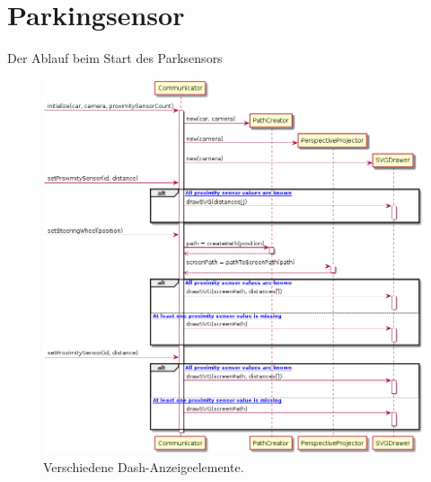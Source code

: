 \documentclass[entwurf.tex]{subfiles}
\begin{document}
  	\newpage
	\section{Parkingsensor}
		Der Ablauf beim Start des Parksensors
		\begin{figure}[H]
  			\begin{center}
 				\includegraphics[width=\textwidth]{diagrams/ParkingSensor/sequence_diagram.png}
  				\caption{Verschiedene Dash-Anzeigeelemente.}
  			\end{center}
  		\end{figure}
\end{document}
